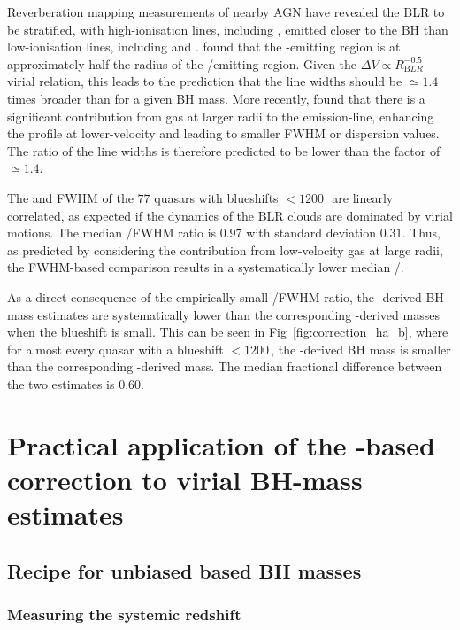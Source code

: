 Reverberation mapping measurements of nearby AGN have revealed the BLR to be stratified, with high-ionisation lines, including , emitted closer to the BH than low-ionisation lines, including \ha and \hb \citep[e.g.][]{onken02}.
\citet{vestergaard06} found that the -emitting region is at approximately half the radius of the \hbns/\ha emitting region.
Given the $\Delta V \propto R_{\mathrm BLR}^{-0.5}$ virial relation, this leads to the prediction that the  line widths should be $\simeq 1.4$ times broader than \ha for a given BH mass. 
More recently, \citet{denney12} found that there is a significant contribution from gas at larger radii to the  emission-line, enhancing the profile at lower-velocity and leading to smaller FWHM or dispersion values. 
The ratio of the line widths is therefore predicted to be lower than the factor of $\simeq 1.4$. 

The \ha and  FWHM of the $77$ quasars with  blueshifts $<1200$\,\kms\, are linearly correlated, as expected if the dynamics of the BLR clouds are dominated by virial motions. 
The median /\ha FWHM ratio is $0.97$ with standard deviation $0.31$. 
Thus, as predicted by considering the contribution from low-velocity gas at large radii, the FWHM-based comparison results in a systematically lower median /\hans.

As a direct consequence of the empirically small /\ha FWHM ratio, the -derived BH mass estimates are systematically lower than the corresponding \hans-derived masses when the blueshift is small.
This can be seen in Fig~\ref{fig:correction_ha_b}, where for almost every quasar with a  blueshift $<$$1200$\,\kms, the -derived BH mass is smaller than the corresponding \hans-derived mass.
The median fractional difference between the two estimates is $0.60$.  

\section{Practical application of the -based correction to virial BH-mass estimates}

\subsection{Recipe for unbiased  based BH masses}
\label{sec:ch3-recipe}

\subsubsection{Measuring the systemic redshift}

